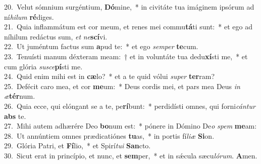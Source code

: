 {20.~}Velut sómnium surgéntium, \textbf{Dó}mine,~* in civitáte tua imáginem ipsórum ad ní\textit{hi}\textit{lum} \textbf{ré}diges.\\
{21.~}Quia inflammátum est cor meum, et renes mei commu\textbf{tá}ti sunt:~* et ego ad níhilum redáctus sum, \textit{et} \textit{ne}\textbf{scí}vi.\\
{22.~}Ut juméntum factus sum \textbf{a}pud te:~* et ego \textit{sem}\textit{per} \textbf{te}cum.\\
{23.~}Tenuísti manum déxteram meam:~† et in voluntáte tua dedu\textbf{xí}sti me,~* et cum glória \textit{su}\textit{sce}\textbf{pí}sti me.\\
{24.~}Quid enim mihi est in \textbf{cæ}lo?~* et a te quid vólui \textit{su}\textit{per} \textbf{ter}ram?\\
{25.~}Defécit caro mea, et cor \textbf{me}um:~* Deus cordis mei, et pars mea Deus \textit{in} \textit{æ}\textbf{tér}num.\\
{26.~}Quia ecce, qui elóngant se a te, pe\textbf{rí}bunt:~* perdidísti omnes, qui forni\textit{cán}\textit{tur} \textbf{abs} te.\\
{27.~}Mihi autem adhærére Deo \textbf{bo}num est:~* pónere in Dómino De\textit{o} \textit{spem} \textbf{me}am:\\
{28.~}Ut annúntiem omnes prædicatiónes \textbf{tu}as,~* in portis fí\textit{li}\textit{æ} \textbf{Si}on.\\
{29.~}Glória Patri, et \textbf{Fí}lio,~* et Spirí\textit{tu}\textit{i} \textbf{San}cto.\\
{30.~}Sicut erat in princípio, et nunc, et \textbf{sem}per,~* et in sǽcula sæcu\textit{ló}\textit{rum}. \textbf{A}men.\\
